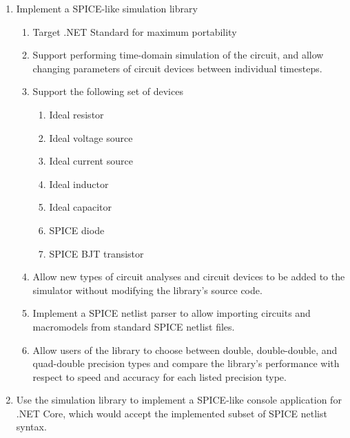 \begin{enumerate}
	\item Implement a SPICE-like simulation library	
	\begin{enumerate}
		\item Target .NET Standard for maximum portability
		\item \label{goal:transient} Support performing time-domain simulation of the circuit, and allow changing parameters of circuit devices between individual timesteps.
		
		\item \label{goal:devices} Support the following set of devices
		\begin{enumerate}
			\item Ideal resistor
			\item Ideal voltage source
			\item Ideal current source
			\item Ideal inductor
			\item Ideal capacitor
			\item SPICE diode
			\item SPICE BJT transistor
		\end{enumerate}
	
		\item \label{goal:extension} Allow new types of circuit analyses and circuit devices to be added to the simulator without modifying the library's source code.
	
		\item \label{goal:parser} Implement a SPICE netlist parser to allow importing circuits and macromodels from standard SPICE netlist files.

		\item \label{goal:dd} Allow users of the library to choose between double, double-double, and quad-double precision types and compare the library's performance with respect to speed and accuracy for each listed precision type.
	\end{enumerate}

	\item \label{goal:app} Use the simulation library to implement a SPICE-like console application for .NET Core, which would accept the implemented subset of SPICE netlist syntax.
\end{enumerate}
